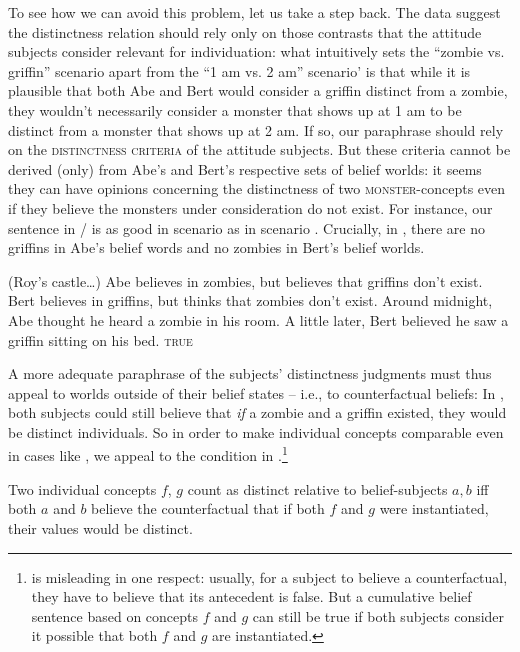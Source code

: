 \documentclass[output=paper]{langscibook}
\begin{document}
To see how we can avoid this problem, let us take a step back.  The data  suggest the distinctness relation should rely only on those contrasts that the attitude subjects consider relevant for individuation: what intuitively sets the ``zombie vs. griffin'' scenario apart from the ``1 am vs. 2 am'' scenario' is that while it is plausible that both Abe and Bert would consider a griffin distinct from a zombie, they wouldn't necessarily consider a monster that shows up at 1 am to be distinct from a monster that shows up at 2 am. If so, our paraphrase should rely on the \textsc{distinctness criteria} of the attitude subjects. But these criteria cannot be derived (only) from Abe's and Bert's respective sets of belief worlds: it seems they can have opinions concerning the distinctness of two \textsc{monster}-concepts even if they believe the monsters under consideration do not exist. For instance, our sentence in / is as good in scenario  as in scenario . Crucially, in  , there are no griffins in Abe's belief words and no zombies in Bert's belief worlds.

\eanoraggedright \label{sch-has:ex:36c} (Roy's castle\ldots) Abe believes in zombies, but believes that griffins don't exist. Bert believes  in griffins, but thinks that zombies don't exist. Around midnight, Abe thought he heard a zombie in his room. A little later, Bert believed he saw a griffin sitting on his bed. \hfill {} \textsc{true}  \z

\noindent A more adequate paraphrase of the subjects' distinctness judgments must thus appeal to worlds outside of their belief states -- i.e., to counterfactual beliefs: In , both subjects could still believe that \textit{if} a zombie and a griffin existed, they would be distinct individuals. So in order to make individual concepts comparable even in cases like  ,  we appeal to the condition in .\footnote{ is misleading in one respect: usually, for a subject to believe a counterfactual, they have to believe that its antecedent is false. But a cumulative belief sentence based on concepts $f$ and $g$ can still be true if both subjects consider it possible that both $f$ and $g$ are instantiated.}

\eanoraggedright \label{sch-has:ex:37}  Two individual concepts $f$, $g$ count as distinct relative to belief-subjects $a,b$ iff  both $a$ and $b$ believe the counterfactual that if both $f$ and $g$ were instantiated, their values would be distinct.\z
\end{document}
